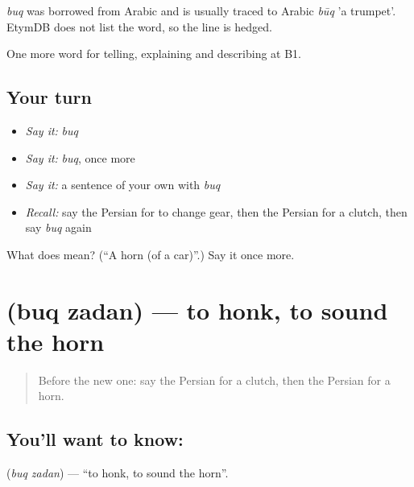 \begin{cousinweb}
\emph{buq} was borrowed from Arabic and is usually traced to Arabic \emph{būq} 'a trumpet'. EtymDB does not list the word, so the line is hedged.
\end{cousinweb}

\begin{grammarlens}[title={What you've built}]
One more word for telling, explaining and describing at B1.
\end{grammarlens}

\subsection*{Your turn}
\begin{itemize}
\raggedright
  \item \emph{Say it:} \emph{buq}
  \item \emph{Say it:} \emph{buq}, once more
  \item \emph{Say it:} a sentence of your own with \emph{buq}
  \item \emph{Recall:} say the Persian for to change gear, then the Persian for a clutch, then say \emph{buq} again
\end{itemize}

\begin{tcolorbox}[breakable,colback=teal!4,colframe=teal!35!black,title={Before you move on}]
What does  mean? (\textquotedblleft{}A horn (of a car)\textquotedblright{}.) Say it once more.
\end{tcolorbox}
\section[\texorpdfstring{\fa{بوق} \fa{زدن} (buq zadan)}{بوق زدن (buq zadan)}]{  (buq zadan) — to honk, to sound the horn}

\label{lesson:FA-C421-buq-zadan}



\begin{quote}
Before the new one: say the Persian for a clutch, then the Persian for a horn.
\end{quote}

\subsection*{You'll want to know:  }
\textbf{ } (\emph{buq zadan}) — \textquotedblleft{}to honk, to sound the horn\textquotedblright{}.

